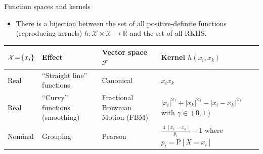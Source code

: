 \documentclass{beamer}\usepackage[]{graphicx}\usepackage[]{color}
\DeclareMathOperator{\indicator}{\mathds{1}}
\begin{document}
\begin{frame}{Function spaces and kernels}
	\begin{itemize}
		\item There is a bijection between the set of all positive-definite functions (reproducing kernels) $h:\mathcal X \times \mathcal X \rightarrow \mathbb R$ and the set of all RKHS.
	\end{itemize}

	\small{
	\renewcommand{\arraystretch}{1.3}
	\begin{table}[htdp]
	\begin{center}
	\begin{tabular}{m{1.15cm}|m{2.5cm}|m{2.7cm}|m{3.3cm}}
	$\tiny{\mathcal X \!=\! \{x_i\}}$	&\textbf{Effect}		&\textbf{Vector space} $\mathcal{F}$		&\textbf{Kernel} $h( x_i,  x_k)$ \\
	\hline
	Real		&\footnotesize{``Straight line'' \newline functions}
	&Canonical	&$x_ix_k$ \\
	\hline
	Real		&\footnotesize{``Curvy'' functions \newline (smoothing)}
	&Fractional Brownian Motion (FBM)	&\footnotesize{$|x_i|^{2\gamma} + |x_k|^{2\gamma} - |x_i - x_k|^{2\gamma}$ with $\gamma \in (0,1)$} \\
	\hline
	Nominal		&\footnotesize{Grouping}
	&Pearson	&$\frac{\indicator[x_i=x_k]}{p_i} - 1$ \newline \footnotesize{where $p_i = \text{P}[X = x_i]$} \\
	\end{tabular}
	\end{center}
	\label{default}
	\end{table}
	}

\end{frame}
\end{document}
